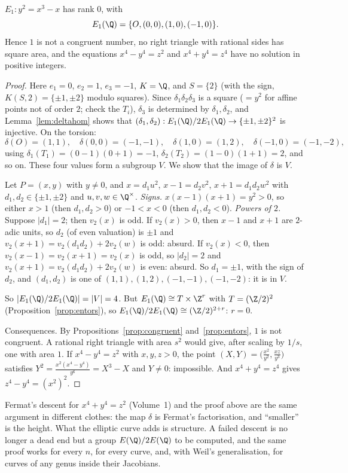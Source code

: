 \begin{theorem}[Fermat]\label{thm:onecongruent}
$E_1:y^2=x^3-x$ has rank $0$, with
\[
E_1(\Q)=\{O,(0,0),(1,0),(-1,0)\}.
\]
Hence $1$ is not a congruent number, no right triangle with rational sides has square area, and
the equations $x^4-y^4=z^2$ and $x^4+y^4=z^4$ have no solution in positive integers.
\end{theorem}
\begin{proof}
Here $e_1=0$, $e_2=1$, $e_3=-1$, $K=\Q$, and $S=\{2\}$ (with the sign, $K(S,2)=\{\pm1,\pm2\}$ modulo squares). Since $\delta_1\delta_2\delta_3$ is a square
($=y^2$ for affine points not of order $2$; check the $T_i$), $\delta_3$ is determined by $\delta_1,\delta_2$, and Lemma~\ref{lem:deltahom} shows that
$(\delta_1,\delta_2):E_1(\Q)/2E_1(\Q)\to\{\pm1,\pm2\}^2$ is injective. On the torsion:
\[
\delta(O)=(1,1),\quad\delta(0,0)=(-1,-1),\quad\delta(1,0)=(1,2),\quad\delta(-1,0)=(-1,-2),
\]
using $\delta_1(T_1)=(0-1)(0+1)=-1$, $\delta_2(T_2)=(1-0)(1+1)=2$, and so on. These four values form a subgroup $V$. We show that the image of $\delta$ is $V$.

Let $P=(x,y)$ with $y\ne0$, and $x=d_1u^2$, $x-1=d_2v^2$, $x+1=d_1d_2w^2$ with $d_1,d_2\in\{\pm1,\pm2\}$ and $u,v,w\in\Q^\times$. \emph{Signs.} $x(x-1)(x+1)=y^2>0$, so either
$x>1$ (then $d_1,d_2>0$) or $-1<x<0$ (then $d_1,d_2<0$). \emph{Powers of $2$.} Suppose $|d_1|=2$; then $v_2(x)$ is odd. If $v_2(x)>0$, then $x-1$ and $x+1$ are
$2$-adic units, so $d_2$ (of even valuation) is $\pm1$ and $v_2(x+1)=v_2(d_1d_2)+2v_2(w)$ is odd: absurd. If $v_2(x)<0$, then
$v_2(x-1)=v_2(x+1)=v_2(x)$ is odd, so $|d_2|=2$ and $v_2(x+1)=v_2(d_1d_2)+2v_2(w)$ is even: absurd. So $d_1=\pm1$, with the sign of $d_2$, and $(d_1,d_2)$ is
one of $(1,1),(1,2),(-1,-1),(-1,-2)$: it is in $V$.

So $|E_1(\Q)/2E_1(\Q)|=|V|=4$. But $E_1(\Q)\cong T\times\Z^r$ with $T=(\Z/2)^2$ (Proposition~\ref{prop:entors}), so $E_1(\Q)/2E_1(\Q)\cong(\Z/2)^{2+r}$: $r=0$.

Consequences. By Propositions~\ref{prop:congruent} and~\ref{prop:entors}, $1$ is not congruent. A rational right triangle with area $s^2$ would give, after scaling by $1/s$,
one with area $1$. If $x^4-y^4=z^2$ with $x,y,z>0$, the point $(X,Y)=\bigl(\frac{x^2}{y^2},\frac{xz}{y^3}\bigr)$ satisfies $Y^2=\frac{x^2(x^4-y^4)}{y^6}=X^3-X$ and $Y\ne0$:
impossible. And $x^4+y^4=z^4$ gives $z^4-y^4=(x^2)^2$.
\end{proof}

\begin{beauty}
Fermat's descent for $x^4+y^4=z^2$ (Volume~1) and the proof above are the same argument in different clothes: the map $\delta$ is Fermat's factorisation, and
``smaller'' is the height. What the elliptic curve adds is structure. A failed descent is no longer a dead end but a group $E(\Q)/2E(\Q)$ to be computed,
and the same proof works for every $n$, for every curve, and, with Weil's generalisation, for curves of any genus inside their Jacobians.
\end{beauty}

